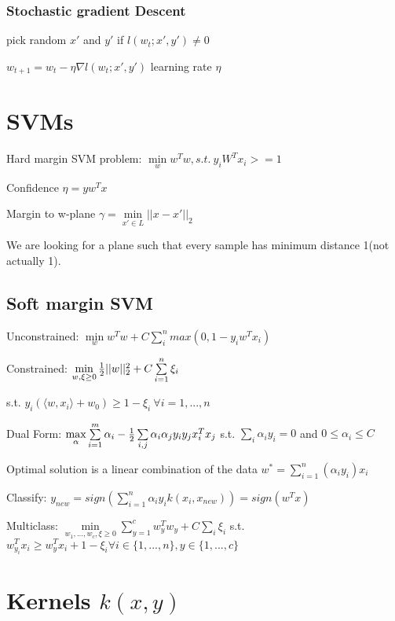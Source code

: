 \documentclass[11pt,twocolumn]{article}
\begin{document}
\subsubsection{Stochastic gradient Descent}
pick random $x'$ and $y'$
if $ l(w_t;x',y') \neq 0$

$w_{t+1} = w_{t} - \eta \nabla l(w_t;x', y') $  learning rate $\eta$



\section{SVMs}
Hard margin SVM problem: $\min \limits_w w^Tw , s.t.~ y_i W^T x_i >= 1$



Confidence $\eta = y w^T x$

Margin to w-plane $\gamma = \min \limits_{x' \in L} ||x-x'||_2 $

We are looking for a plane such that every sample has minimum distance 1(not actually 1).


\subsection{Soft margin SVM}

Unconstrained: $\min \limits_w w^Tw + C \sum \limits_i^n max\left(0, 1-y_iw^Tx_i\right)$


Constrained: $\min \limits_{w, \xi \geq	 0} {{1 \over 2} ||w||_2^2 + C \sum \limits_{i=1}^n {\xi_i}}$ 

s.t. $ y_i \left( \langle w, x_i \rangle + w_0 \right) \geq 1 - \xi_i ~ \forall i = 1,...,n$


Dual Form: $ \max \limits_{\alpha} \sum \limits_{i=1}^m \alpha_i - {1 \over 2} \sum \limits_{i,j} \alpha_i \alpha_j y_i y_j x_i^T x_j$ s.t. $\sum \limits_i \alpha_i y_i  = 0$ and $0 \leq \alpha_i \leq C$


Optimal solution is a linear combination of the data $w^* = \sum \limits_{i=1}^n \left( \alpha_i y_i \right) x_i$

Classify: $y_{new} 
= sign(  \sum \limits_{i=1}^n \alpha_i y_i  k(x_i, x_{new}))
= sign(w^Tx)$


Multiclass: $ \min \limits_{w_1,...,w_c, \xi \geq 0} \sum \limits_{y=1}^{c}w_y^Tw_y + C \sum \limits_{i} \xi_i$ s.t. $w_{y_i}^Tx_i \geq w_y^T x_i + 1 - \xi_i \forall i \in \lbrace1,...,n\rbrace, y \in \lbrace1,...,c\rbrace$

\section{Kernels $k(x,y)$}
\end{document}
